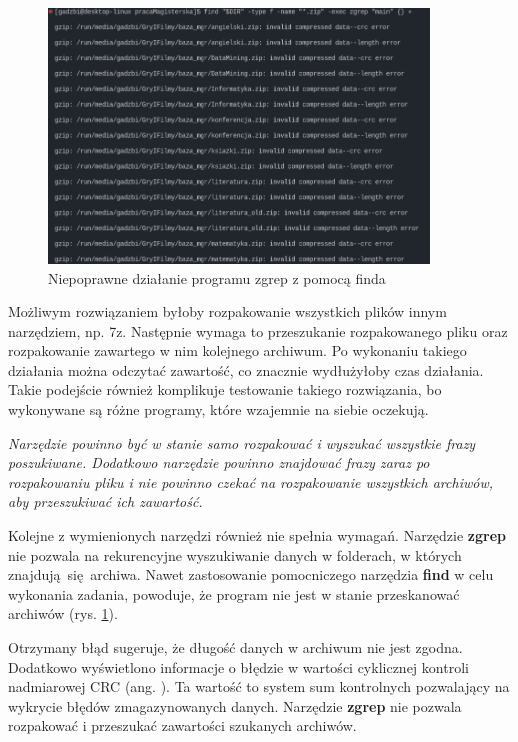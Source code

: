 \begin{figure}[htbp]
    \centering
    \includegraphics[width=0.9\textwidth]{./images/zgrep-errors.png}
    \caption{Niepoprawne działanie programu zgrep z pomocą finda}
    \label{fig:zgrepErrors}
    \end{figure}

Możliwym rozwiązaniem byłoby rozpakowanie wszystkich plików innym narzędziem, np.
7z. Następnie wymaga to przeszukanie rozpakowanego pliku oraz rozpakowanie 
zawartego w nim kolejnego archiwum. Po wykonaniu takiego działania można 
odczytać zawartość, co znacznie wydłużyłoby czas działania. Takie podejście również
komplikuje testowanie takiego rozwiązania, bo wykonywane są różne programy, 
które wzajemnie na siebie oczekują. 

\textit{Narzędzie powinno być w stanie samo 
rozpakować i wyszukać wszystkie frazy poszukiwane. Dodatkowo narzędzie powinno
znajdować frazy zaraz po rozpakowaniu pliku i nie powinno czekać na rozpakowanie
wszystkich archiwów, aby przeszukiwać ich zawartość.}

Kolejne z wymienionych narzędzi również nie spełnia wymagań. Narzędzie \textbf{zgrep} nie pozwala
na rekurencyjne wyszukiwanie danych w folderach, w których znajdują się archiwa.
Nawet zastosowanie pomocniczego narzędzia \textbf{find} w celu wykonania zadania,
powoduje, że program nie jest w stanie przeskanować archiwów (rys. \ref{fig:zgrepErrors}).

Otrzymany błąd sugeruje, że długość danych w archiwum nie jest zgodna. Dodatkowo
wyświetlono informacje o błędzie w wartości cyklicznej kontroli nadmiarowej CRC
(ang. ). Ta wartość to system sum kontrolnych
pozwalający na wykrycie błędów zmagazynowanych danych. Narzędzie \textbf{zgrep} nie pozwala 
rozpakować i przeszukać zawartości szukanych archiwów.

